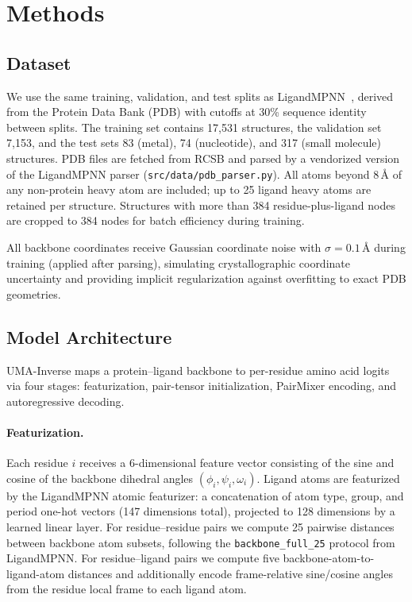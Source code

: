 \documentclass[11pt,letterpaper]{article}
\begin{document}
\section{Methods}
\label{sec:methods}

\subsection{Dataset}
\label{sec:data}

We use the same training, validation, and test splits as LigandMPNN~\citep{dauparas2023atomic},
derived from the Protein Data Bank (PDB) with cutoffs at 30\% sequence identity between splits.
The training set contains 17{,}531 structures, the validation set 7{,}153, and the test sets
83 (metal), 74 (nucleotide), and 317 (small molecule) structures. PDB files are fetched from
RCSB and parsed by a vendorized version of the LigandMPNN parser
(\texttt{src/data/pdb\_parser.py}). All atoms beyond 8\,{\AA} of any non-protein heavy atom are
included; up to 25 ligand heavy atoms are retained per structure. Structures with more than 384
residue-plus-ligand nodes are cropped to 384 nodes for batch efficiency during training.

All backbone coordinates receive Gaussian coordinate noise with $\sigma{=}0.1$\,{\AA} during
training (applied after parsing), simulating crystallographic coordinate uncertainty and
providing implicit regularization against overfitting to exact PDB geometries.

\subsection{Model Architecture}
\label{sec:arch}

UMA-Inverse maps a protein--ligand backbone to per-residue amino acid logits via four stages:
featurization, pair-tensor initialization, PairMixer encoding, and autoregressive decoding.

\paragraph{Featurization.}
Each residue $i$ receives a 6-dimensional feature vector consisting of the sine and cosine of the
backbone dihedral angles $(\phi_i, \psi_i, \omega_i)$. Ligand atoms are featurized by the
LigandMPNN atomic featurizer: a concatenation of atom type, group, and period one-hot vectors
(147 dimensions total), projected to 128 dimensions by a learned linear layer. For residue--residue
pairs we compute 25 pairwise distances between backbone atom subsets, following the
\texttt{backbone\_full\_25} protocol from LigandMPNN. For residue--ligand pairs we compute five
backbone-atom-to-ligand-atom distances and additionally encode frame-relative sine/cosine angles
from the residue local frame to each ligand atom.
\end{document}
